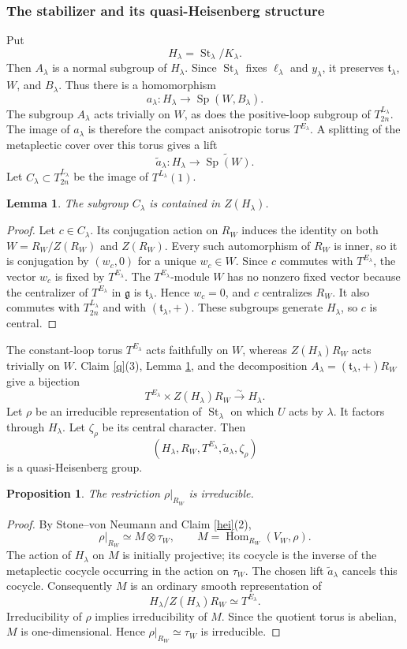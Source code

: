 \documentclass[11pt,a4paper,twoside]{amsart}
\newtheorem{lemma}[theorem]{Lemma}
\newtheorem{proposition}[theorem]{Proposition}
\theoremstyle{definition}
\theoremstyle{remark}
\newcommand{\tori}{\mathfrak t}
\newcommand{\bl}{\lambda}
\newcommand{\fg}{\mathfrak g}
\newcommand{\St}{\operatorname{St}}
\newcommand{\Sp}{\operatorname{Sp}}
\newcommand{\Hom}{\operatorname{Hom}}
\begin{document}
\subsubsection{The stabilizer and its quasi-Heisenberg structure}
Put
$$
H_\bl=\St_\bl/K_\bl.
$$
Then $A_\bl$ is a normal subgroup of $H_\bl$. Since $\St_\bl$ fixes $\ell_\bl$ and $y_\bl$, it preserves $\tori_\bl$, $W$, and $B_\bl$. Thus there is a homomorphism
$$
a_\bl:H_\bl\longrightarrow\Sp(W,B_\bl).
$$
The subgroup $A_\bl$ acts trivially on $W$, as does the positive-loop subgroup of $T^{L_\bl}_{2n}$. The image of $a_\bl$ is therefore the compact anisotropic torus $T^{E_\bl}$. A splitting of the metaplectic cover over this torus gives a lift
$$
\widetilde a_\bl:H_\bl\longrightarrow\widetilde{\Sp(W)}.
$$
Let $C_\bl\subset T^{L_\bl}_{2n}$ be the image of $T^{L_\bl}(1)$.
\begin{lemma}\label{positive-loop-central}
The subgroup $C_\bl$ is contained in $Z(H_\bl)$.
\end{lemma}
\begin{proof}
Let $c\in C_\bl$. Its conjugation action on $R_W$ induces the identity on both $W=R_W/Z(R_W)$ and $Z(R_W)$. Every such automorphism of $R_W$ is inner, so it is conjugation by $(w_c,0)$ for a unique $w_c\in W$. Since $c$ commutes with $T^{E_\bl}$, the vector $w_c$ is fixed by $T^{E_\bl}$. The $T^{E_\bl}$-module $W$ has no nonzero fixed vector because the centralizer of $T^{E_\bl}$ in $\fg$ is $\tori_\bl$. Hence $w_c=0$, and $c$ centralizes $R_W$. It also commutes with $T^{L_\bl}_{2n}$ and with $(\tori_\bl,+)$. These subgroups generate $H_\bl$, so $c$ is central.
\end{proof}
The constant-loop torus $T^{E_\bl}$ acts faithfully on $W$, whereas $Z(H_\bl)R_W$ acts trivially on $W$. Claim \ref{q}(3), Lemma \ref{positive-loop-central}, and the decomposition $A_\bl=(\tori_\bl,+)R_W$ give a bijection
$$
T^{E_\bl}\times Z(H_\bl)R_W\stackrel{\sim}{\longrightarrow}H_\bl.
$$
Let $\rho$ be an irreducible representation of $\St_\bl$ on which $U$ acts by $\bl$. It factors through $H_\bl$. Let $\zeta_\rho$ be its central character. Then
$$
(H_\bl,R_W,T^{E_\bl},\widetilde a_\bl,\zeta_\rho)
$$
is a quasi-Heisenberg group.
\begin{proposition}\label{A-prime}
The restriction $\rho|_{R_W}$ is irreducible.
\end{proposition}
\begin{proof}
By Stone--von Neumann and Claim \ref{hei}(2),
$$
\rho|_{R_W}\simeq M\otimes\tau_W,
\qquad
M=\Hom_{R_W}(V_W,\rho).
$$
The action of $H_\bl$ on $M$ is initially projective; its cocycle is the inverse of the metaplectic cocycle occurring in the action on $\tau_W$. The chosen lift $\widetilde a_\bl$ cancels this cocycle. Consequently $M$ is an ordinary smooth representation of
$$
H_\bl/Z(H_\bl)R_W\simeq T^{E_\bl}.
$$
Irreducibility of $\rho$ implies irreducibility of $M$. Since the quotient torus is abelian, $M$ is one-dimensional. Hence $\rho|_{R_W}\simeq\tau_W$ is irreducible.
\end{proof}
\end{document}
